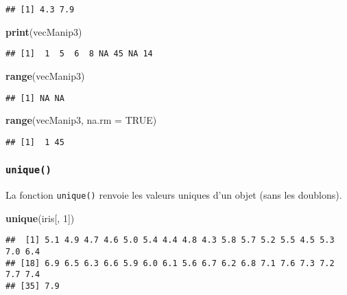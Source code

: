 \documentclass[]{book}
\newenvironment{Shaded}{\begin{snugshade}}{\end{snugshade}}
\newcommand{\KeywordTok}[1]{\textcolor[rgb]{0.13,0.29,0.53}{\textbf{#1}}}
\newcommand{\DataTypeTok}[1]{\textcolor[rgb]{0.13,0.29,0.53}{#1}}
\newcommand{\DecValTok}[1]{\textcolor[rgb]{0.00,0.00,0.81}{#1}}
\newcommand{\OtherTok}[1]{\textcolor[rgb]{0.56,0.35,0.01}{#1}}
\newcommand{\NormalTok}[1]{#1}
\theoremstyle{definition}
\theoremstyle{definition}
\theoremstyle{definition}
\theoremstyle{remark}
\begin{document}
\begin{verbatim}
## [1] 4.3 7.9
\end{verbatim}

\begin{Shaded}
\begin{Highlighting}[]
\KeywordTok{print}\NormalTok{(vecManip3)}
\end{Highlighting}
\end{Shaded}

\begin{verbatim}
## [1]  1  5  6  8 NA 45 NA 14
\end{verbatim}

\begin{Shaded}
\begin{Highlighting}[]
\KeywordTok{range}\NormalTok{(vecManip3)}
\end{Highlighting}
\end{Shaded}

\begin{verbatim}
## [1] NA NA
\end{verbatim}

\begin{Shaded}
\begin{Highlighting}[]
\KeywordTok{range}\NormalTok{(vecManip3, }\DataTypeTok{na.rm =} \OtherTok{TRUE}\NormalTok{)}
\end{Highlighting}
\end{Shaded}

\begin{verbatim}
## [1]  1 45
\end{verbatim}

\subsubsection{\texorpdfstring{\texttt{unique()}}{unique()}}\label{l015unique}

La fonction \texttt{unique()} renvoie les valeurs uniques d'un objet
(sans les doublons).

\begin{Shaded}
\begin{Highlighting}[]
\KeywordTok{unique}\NormalTok{(iris[, }\DecValTok{1}\NormalTok{])}
\end{Highlighting}
\end{Shaded}

\begin{verbatim}
##  [1] 5.1 4.9 4.7 4.6 5.0 5.4 4.4 4.8 4.3 5.8 5.7 5.2 5.5 4.5 5.3 7.0 6.4
## [18] 6.9 6.5 6.3 6.6 5.9 6.0 6.1 5.6 6.7 6.2 6.8 7.1 7.6 7.3 7.2 7.7 7.4
## [35] 7.9
\end{verbatim}
\end{document}
